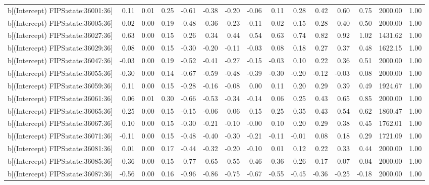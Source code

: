 \begin{table}[ht]
\begin{tabular}{rrrrrrrrrrrrrrr}
  b[(Intercept) FIPS:state:36001:36] & 0.11 & 0.01 & 0.25 & -0.61 & -0.38 & -0.20 & -0.06 & 0.11 & 0.28 & 0.42 & 0.60 & 0.75 & 2000.00 & 1.00 \\ 
  b[(Intercept) FIPS:state:36005:36] & 0.02 & 0.00 & 0.19 & -0.48 & -0.36 & -0.23 & -0.11 & 0.02 & 0.15 & 0.28 & 0.40 & 0.50 & 2000.00 & 1.00 \\ 
  b[(Intercept) FIPS:state:36027:36] & 0.63 & 0.00 & 0.15 & 0.26 & 0.34 & 0.44 & 0.54 & 0.63 & 0.74 & 0.82 & 0.92 & 1.02 & 1431.62 & 1.00 \\ 
  b[(Intercept) FIPS:state:36029:36] & 0.08 & 0.00 & 0.15 & -0.30 & -0.20 & -0.11 & -0.03 & 0.08 & 0.18 & 0.27 & 0.37 & 0.48 & 1622.15 & 1.00 \\ 
  b[(Intercept) FIPS:state:36047:36] & -0.03 & 0.00 & 0.19 & -0.52 & -0.41 & -0.27 & -0.15 & -0.03 & 0.10 & 0.22 & 0.36 & 0.51 & 2000.00 & 1.00 \\ 
  b[(Intercept) FIPS:state:36055:36] & -0.30 & 0.00 & 0.14 & -0.67 & -0.59 & -0.48 & -0.39 & -0.30 & -0.20 & -0.12 & -0.03 & 0.08 & 2000.00 & 1.00 \\ 
  b[(Intercept) FIPS:state:36059:36] & 0.11 & 0.00 & 0.15 & -0.28 & -0.16 & -0.08 & 0.00 & 0.11 & 0.20 & 0.29 & 0.39 & 0.49 & 1924.67 & 1.00 \\ 
  b[(Intercept) FIPS:state:36061:36] & 0.06 & 0.01 & 0.30 & -0.66 & -0.53 & -0.34 & -0.14 & 0.06 & 0.25 & 0.43 & 0.65 & 0.85 & 2000.00 & 1.00 \\ 
  b[(Intercept) FIPS:state:36065:36] & 0.25 & 0.00 & 0.15 & -0.15 & -0.06 & 0.06 & 0.15 & 0.25 & 0.35 & 0.43 & 0.54 & 0.62 & 1860.47 & 1.00 \\ 
  b[(Intercept) FIPS:state:36067:36] & 0.10 & 0.00 & 0.15 & -0.30 & -0.21 & -0.10 & -0.00 & 0.10 & 0.20 & 0.29 & 0.38 & 0.45 & 1762.01 & 1.00 \\ 
  b[(Intercept) FIPS:state:36071:36] & -0.11 & 0.00 & 0.15 & -0.48 & -0.40 & -0.30 & -0.21 & -0.11 & -0.01 & 0.08 & 0.18 & 0.29 & 1721.09 & 1.00 \\ 
  b[(Intercept) FIPS:state:36081:36] & 0.01 & 0.00 & 0.17 & -0.44 & -0.32 & -0.20 & -0.10 & 0.01 & 0.12 & 0.22 & 0.33 & 0.44 & 2000.00 & 1.00 \\ 
  b[(Intercept) FIPS:state:36085:36] & -0.36 & 0.00 & 0.15 & -0.77 & -0.65 & -0.55 & -0.46 & -0.36 & -0.26 & -0.17 & -0.07 & 0.04 & 2000.00 & 1.00 \\ 
  b[(Intercept) FIPS:state:36087:36] & -0.56 & 0.00 & 0.16 & -0.96 & -0.86 & -0.75 & -0.67 & -0.55 & -0.45 & -0.36 & -0.25 & -0.18 & 2000.00 & 1.00 \\ 

\end{tabular}
\end{table}

